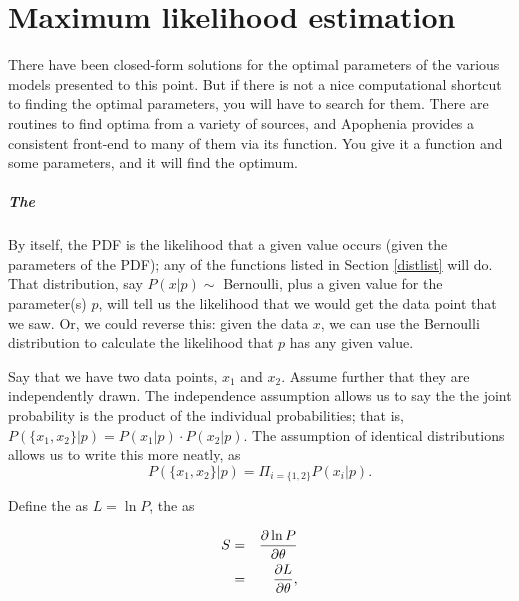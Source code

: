 \chapter{Maximum likelihood estimation} \label{mle}

There have been  
closed-form solutions for the optimal parameters of the various models
presented to this point. 
 But if there is not a nice
computational shortcut to finding the optimal parameters, you will have
to search for them. There are routines to find optima from a variety
of sources, and Apophenia provides a consistent front-end to many of
them via its  function. You give it a
function and some parameters, and it will find the optimum.

\paragraph{The }	\label{the score}
By itself, the PDF is the likelihood that a given value occurs (given
the parameters of the PDF); any of the functions listed in Section
\ref{distlist} will do. That distribution, say $P(x|p)\sim$ Bernoulli,
plus a given value for the parameter(s) $p$, will tell us the likelihood
that we would get the data point that we saw. Or, we could reverse this:
given the data $x$, we can use the Bernoulli distribution to calculate the
likelihood that $p$ has any given value.

Say that we have two data points, $x_1$ and $x_2$. Assume further that
they are independently drawn.  The independence assumption allows us
to say the the joint probability is the product of the individual
probabilities; that is, $P(\{x_1,x_2\}|p)=P(x_1|p)\cdot P(x_2|p)$.
The assumption of identical distributions allows us to write this more
neatly, as $$P(\{x_1,x_2\}|p)=\Pi_{i=\{1,2\}}P(x_i|p).$$

Define the  as $L=\ln P$, the  as

\begin{eqnarray}
S&=&{\partial \ln P\over \partial \theta} \nonumber\\
&=&{\partial L \over \partial \theta},		\nonumber
\end{eqnarray}


